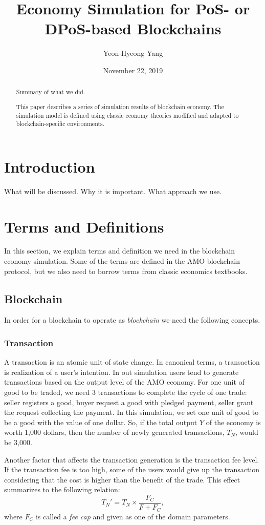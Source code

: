 \documentclass[a4paper,11pt]{scrartcl}
\title{Economy Simulation for PoS- or DPoS-based Blockchains}
\date{November 22, 2019}
\author{Yeon-Hyeong Yang}
\affil{AMO Labs}
\begin{document}
\maketitle

\begin{abstract}
	Summary of what we did.

	This paper describes a series of simulation results of blockchain economy.
	The simulation model is defined using classic economy theories modified and
	adapted to blockchain-specific environments.
\end{abstract}

\section{Introduction}
What will be discussed. Why it is important. What approach we use.

\section{Terms and Definitions}
In this section, we explain terms and definition we need in the blockchain
economy simulation. Some of the terms are defined in the AMO blockchain
protocol, but we also need to borrow terms from classic economics textbooks.

\subsection{Blockchain}
In order for a blockchain to operate as \emph{blockchain} we need the following
concepts.

\subsubsection{Transaction}
A transaction is an atomic unit of state change. In canonical terms, a
transaction is realization of a user's intention. In out simulation users tend
to generate transactions based on the output level of the AMO economy. For one
unit of good to be traded, we need 3 transactions to complete the cycle of one
trade: seller registers a good, buyer request a good with pledged payment,
seller grant the request collecting the payment. In this simulation, we set one
unit of good to be a good with the value of one dollar. So, if the total output
$Y$ of the economy is worth 1,000 dollars, then the number of newly generated
transactions, $T_N$, would be 3,000. 

Another factor that affects the transaction generation is the transaction fee
level. If the transaction fee is too high, some of the users would give up the
transaction considering that the cost is higher than the benefit of the trade.
This effect summarizes to the following relation:
\begin{equation}
	T_N' = T_N \times \frac{F_C}{F + F_C},
\end{equation}
where $F_C$ is called a \emph{fee cap} and given as one of the domain
parameters.
\end{document}
